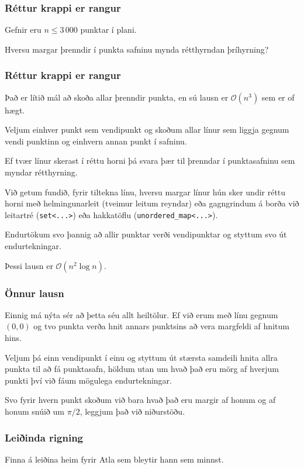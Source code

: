 {
	\frametitle{Réttur krappi er rangur}
	{
		\item<1-> Gefnir eru $n \leq 3\, 000$ punktar í plani.
		\item<2-> Hversu margar þrenndir í punkta safninu mynda rétthyrndan þríhyrning?
	}
}

{
	\frametitle{Réttur krappi er rangur}
	{
		\item<1-> Það er lítið mál að skoða allar þrenndir punkta, en sú lausn er $\mathcal{O}(n^3)$ sem er of hægt.
		\item<2-> Veljum einhver punkt sem vendipunkt og skoðum allar línur sem liggja gegnum vendi punktinn og einhvern annan punkt í safninu.
		\item<3-> Ef tvær línur skerast í réttu horni þá svara þær til þrenndar í punktasafninu sem myndar rétthyrning.
		\item<4-> Við getum fundið, fyrir tiltekna línu, hversu margar línur hún sker undir réttu horni með helmingunarleit (tveimur leitum reyndar)
					eða gagngrindum á borða við leitartré (\texttt{set<...>}) eða hakkatöflu (\texttt{unordered\_map<...>}).
		\item<5-> Endurtökum svo þannig að allir punktar verði vendipunktar og styttum svo út endurtekningar.
		\item<6-> Þessi lausn er $\mathcal{O}(n^2 \log n)$.
	}
}

{
    \frametitle{Önnur lausn}
    {
        \item<1-> Einnig má nýta sér að þetta séu allt heiltölur. Ef við erum með línu gegnum $(0, 0)$ og tvo punkta verða hnit annars punktsins
            að vera margfeldi af hnitum hins. 
        \item<2-> Veljum þá einn vendipunkt í einu og styttum út stærsta samdeili hnita allra punkta til að fá punktasafn, höldum utan um hvað
            það eru mörg af hverjum punkti því við fáum mögulega endurtekningar.
        \item<3-> Svo fyrir hvern punkt skoðum við bara hvað það eru margir af honum og af honum snúið um $\pi/2$, leggjum það við niðurstöðu.
    }
}

{
	\frametitle{Leiðinda rigning}
	{
		\item<1-> Finna á leiðina heim fyrir Atla sem bleytir hann sem minnst.
	}
}

{
}


